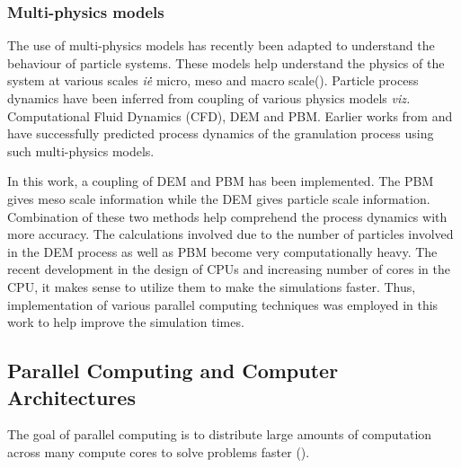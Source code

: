 \documentclass[preprint,11pt,authoryear]{elsarticle}
\begin{document}
\subsubsection{Multi-physics models}
\par The use of multi-physics models has recently been adapted to understand the behaviour of particle systems. These models help understand the physics of the system at various scales \textit{i\.e\.} micro, meso and macro scale(\cite{sen2014}). Particle process dynamics have been inferred from coupling of various physics models \textit{viz.} Computational Fluid Dynamics (CFD), DEM and PBM. Earlier works from \cite{sen2014} and \cite{Barrasso2015cerd} have successfully predicted process dynamics of the granulation process using such multi-physics models.
\par In this work, a coupling of DEM and PBM has been implemented. The PBM gives meso scale information while the DEM gives particle scale information. Combination of these two methods help comprehend the process dynamics with more accuracy. The calculations involved due to the number of particles involved in the DEM process as well as PBM become very computationally heavy. The recent development in the design of CPUs and increasing number of cores in the CPU, it makes sense to utilize them to make the simulations faster. Thus, implementation of various parallel computing techniques was employed in this work to help improve the simulation times.  


\subsection{Parallel Computing and Computer Architectures}
\par The goal of parallel computing is to distribute large amounts of computation across many compute cores to solve problems faster (\cite{wilkinson2005}).
\end{document}
